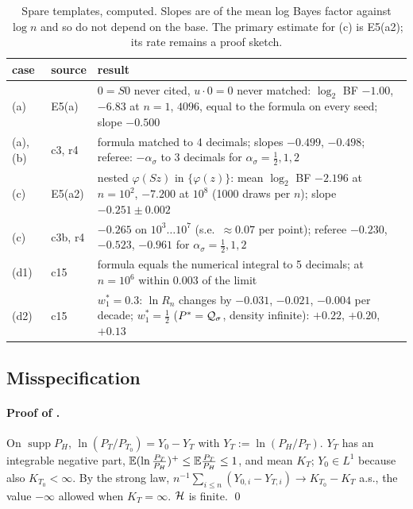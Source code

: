 \begin{table}[ht]
\centering\small
\begin{tabular}{@{}llp{10.4cm}@{}}
\toprule
case & source & result\\
\midrule
(a) & E5(a) & $0=S0$ never cited, $u\cdot0=0$ never matched: $\log_2$ BF $-1.00$, $-6.83$ at $n=1$, $4096$, equal to the formula on every seed; slope $-0.500$\\
(a), (b) & c3, r4 & formula matched to 4 decimals; slopes $-0.499$, $-0.498$; referee: $-\alpha_\sigma$ to 3 decimals for $\alpha_\sigma=\frac12,1,2$\\
(c) & E5(a2) & nested $\varphi(Sz)$ in $\{\varphi(z)\}$: mean $\log_2$ BF $-2.196$ at $n=10^2$, $-7.200$ at $10^8$ (1000 draws per $n$); slope $-0.251\pm0.002$\\
(c) & c3b, r4 & $-0.265$ on $10^3\ldots10^7$ (s.e.\ $\approx0.07$ per point); referee $-0.230$, $-0.523$, $-0.961$ for $\alpha_\sigma=\frac12,1,2$\\
(d1) & c15 & formula equals the numerical integral to 5 decimals; at $n=10^6$ within $0.003$ of the limit\\
(d2) & c15 & $w^*_1=0.3$: $\ln R_n$ changes by $-0.031$, $-0.021$, $-0.004$ per decade; $w^*_1=\frac12$ ($P^*=\mathcal{Q}_\sigma$, density infinite): $+0.22$, $+0.20$, $+0.13$\\
\bottomrule
\end{tabular}
\caption{Spare templates, computed. Slopes are of the mean log Bayes factor against $\log n$ and so do not depend on the base. The primary estimate for (c) is E5(a2); its rate remains a proof sketch.}
\label{tab:ident:spare}
\end{table}

\subsection{Misspecification}\label{app:ident:misspec}

\paragraph{Proof of .} On $\operatorname{supp}P_H$, $\ln(P_T/P_{T_0})=Y_0-Y_T$ with $Y_T:=\ln(P_H/P_T)$. $Y_T$ has an integrable negative part, $\mathbb{E}(\ln\frac{P_T}{P_H})^+\le\mathbb{E}\frac{P_T}{P_H}\le1$, and mean $K_T$; $Y_0\in L^1$ because also $K_{T_0}<\infty$. By the strong law, $n^{-1}\sum_{i\le n}(Y_{0,i}-Y_{T,i})\to K_{T_0}-K_T$ a.s., the value $-\infty$ allowed when $K_T=\infty$. $\mathcal{H}$ is finite. \qed

